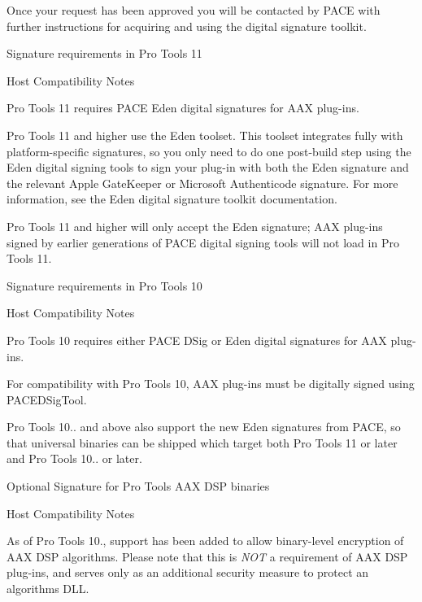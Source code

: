 Once your request has been approved you will be contacted by P\+A\+C\+E with further instructions for acquiring and using the digital signature toolkit.

 Signature requirements in Pro Tools 11

\begin{DoxyRefDesc}{Host Compatibility Notes}
\item[\hyperlink{a00380__compatibility_notes000010}{Host Compatibility Notes}]Pro Tools 11 requires P\+A\+C\+E Eden digital signatures for A\+A\+X plug-\/ins.\end{DoxyRefDesc}


Pro Tools 11 and higher use the Eden toolset. This toolset integrates fully with platform-\/specific signatures, so you only need to do one post-\/build step using the Eden digital signing tools to sign your plug-\/in with both the Eden signature and the relevant Apple Gate\+Keeper or Microsoft Authenticode signature. For more information, see the Eden digital signature toolkit documentation.

Pro Tools 11 and higher will only accept the Eden signature; A\+A\+X plug-\/ins signed by earlier generations of P\+A\+C\+E digital signing tools will not load in Pro Tools 11.

 Signature requirements in Pro Tools 10

\begin{DoxyRefDesc}{Host Compatibility Notes}
\item[\hyperlink{a00380__compatibility_notes000011}{Host Compatibility Notes}]Pro Tools 10 requires either P\+A\+C\+E D\+Sig or Eden digital signatures for A\+A\+X plug-\/ins.\end{DoxyRefDesc}


For compatibility with Pro Tools 10, A\+A\+X plug-\/ins must be digitally signed using P\+A\+C\+E\+D\+Sig\+Tool.

Pro Tools 10.. and above also support the new Eden signatures from P\+A\+C\+E, so that universal binaries can be shipped which target both Pro Tools 11 or later and Pro Tools 10.. or later.

 Optional Signature for Pro Tools A\+A\+X D\+S\+P binaries

\begin{DoxyRefDesc}{Host Compatibility Notes}
\item[\hyperlink{a00380__compatibility_notes000012}{Host Compatibility Notes}]As of Pro Tools 10., support has been added to allow binary-\/level encryption of A\+A\+X D\+S\+P algorithms. Please note that this is {\itshape N\+O\+T} a requirement of A\+A\+X D\+S\+P plug-\/ins, and serves only as an additional security measure to protect an algorithm\textquotesingle{}s D\+L\+L. \end{DoxyRefDesc}


